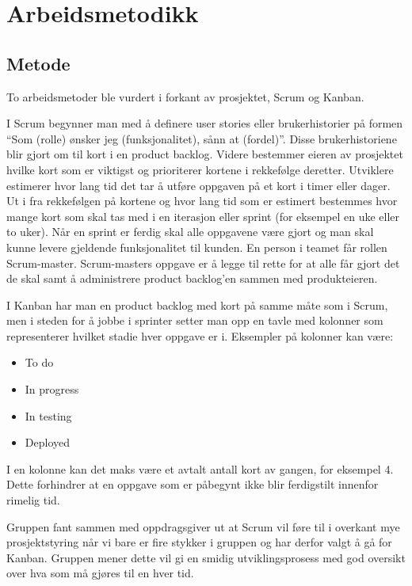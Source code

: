\chapter{Arbeidsmetodikk}
\section{Metode}
To arbeidsmetoder ble vurdert i forkant av prosjektet, Scrum og Kanban.

I Scrum begynner man med å definere user stories eller brukerhistorier på formen ``Som (rolle) ønsker jeg (funksjonalitet), sånn at (fordel)''. Disse brukerhistoriene blir gjort om til kort i en product backlog. Videre bestemmer eieren av prosjektet hvilke kort som er viktigst og prioriterer kortene i rekkefølge deretter. Utviklere estimerer hvor lang tid det tar å utføre oppgaven på et kort i timer eller dager. Ut i fra rekkefølgen på kortene og hvor lang tid som er estimert bestemmes hvor mange kort som skal tas med i en iterasjon eller sprint (for eksempel en uke eller to uker). Når en sprint er ferdig skal alle oppgavene være gjort og man skal kunne levere gjeldende funksjonalitet til kunden. En person i teamet får rollen Scrum-master. Scrum-masters oppgave er å legge til rette for at alle får gjort det de skal samt å administrere product backlog'en sammen med produkteieren.

I Kanban har man en product backlog med kort på samme måte som i Scrum, men i steden for å jobbe i sprinter setter man opp en tavle med kolonner som representerer hvilket stadie hver oppgave er i. Eksempler på kolonner kan være:
\begin{itemize}
\item To do
\item In progress
\item In testing
\item Deployed
\end{itemize}
I en kolonne kan det maks være et avtalt antall kort av gangen, for eksempel 4. Dette forhindrer at en oppgave som er påbegynt ikke blir ferdigstilt innenfor rimelig tid.

Gruppen fant sammen med oppdragsgiver ut at Scrum vil føre til i overkant mye prosjektstyring når vi bare er fire stykker i gruppen og har derfor valgt å gå for Kanban. Gruppen mener dette vil gi en smidig utviklingsprosess med god oversikt over hva som må gjøres til en hver tid.

